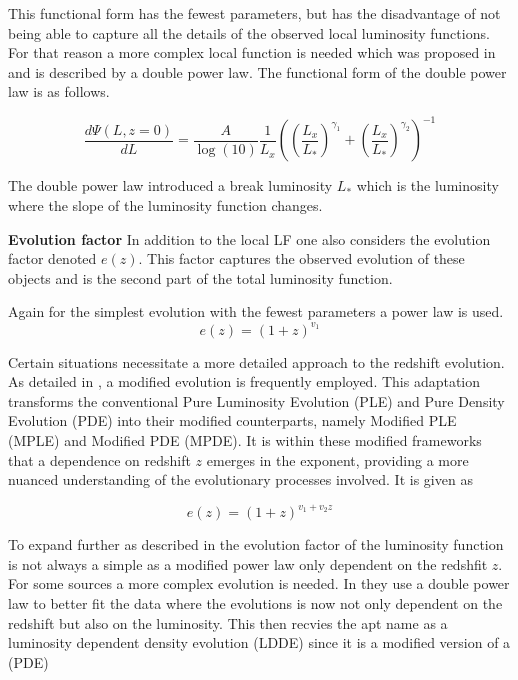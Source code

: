 \documentclass{article}
\begin{document}
This functional form has the fewest parameters, but has the disadvantage of not being able to capture all the details of the observed local luminosity functions.
For that reason a more complex local function is needed which was proposed in \cite{Ueda_2003} and is described by a double power law.
The functional form of the double power law is as follows.


   
\begin{equation}
    \frac{d\Psi(L,z=0)}{dL} =  \frac{A}{\log(10)} \frac{1}{L_x} \left( \left( \frac{L_x}{L_*} \right)^{\gamma_1} + \left( \frac{L_x}{L_*} \right)^{\gamma_2} \right)^{-1}
\end{equation}

The double power law introduced a break luminosity $L_*$ which is the luminosity where the slope of the luminosity function changes.


\textbf{Evolution factor}
In addition to the local LF one also considers the evolution factor denoted $e(z)$. This factor captures the observed evolution of these objects and is the second part of the total luminosity function.

Again for the simplest evolution with the fewest parameters a power law is used.
 $$
e(z) = (1 + z)^{v_1 }
 $$


  
Certain situations necessitate a more detailed approach to the redshift evolution. 
 As detailed in \cite{Ajello_2009}, a modified evolution is frequently employed. 
 This adaptation transforms the conventional Pure Luminosity Evolution (PLE) and Pure Density Evolution 
 (PDE) into their modified counterparts, namely Modified PLE (MPLE) and Modified PDE (MPDE).
It is within these modified frameworks that a dependence on redshift $z$ emerges in the exponent,
providing a more nuanced understanding of the evolutionary processes involved. It is given as

$$
e(z) = (1 + z)^{v_1 +v_2 z }
 $$



 To expand further as described in \cite{Ueda_2003} the evolution factor of the luminosity function is not always a simple as a modified power law only dependent on the redshfit $z$.
For some sources a more complex evolution is needed. In \cite{Ueda_2003} they use a double power law to better fit the data where 
 the evolutions is now not only dependent on the redshift but also on the luminosity. This then recvies the apt name as a luminosity dependent density evolution (LDDE) since it is a modified version of a (PDE)
\end{document}
